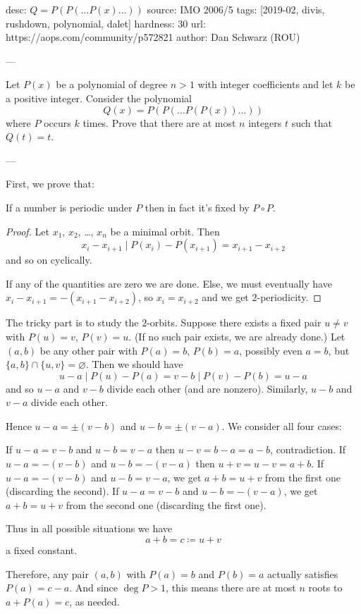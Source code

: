 desc:  $Q = P(P(\dots P(x) \dots))$
source:  IMO 2006/5
tags:  [2019-02, divis, rushdown, polynomial, dalet]
hardness: 30
url: https://aops.com/community/p572821
author: Dan Schwarz (ROU)

---

Let $P(x)$ be a polynomial of degree $n > 1$
with integer coefficients and let $k$ be a positive integer.
Consider the polynomial
\[ Q(x) = P(P(\dots P(P(x)) \dots )) \] where $P$ occurs $k$ times.
Prove that there are at most $n$ integers $t$ such that $Q(t) = t$.


---

First, we prove that:
\begin{claim*}
  [Putnam 2000 et al]
  If a number is periodic under $P$
  then in fact it's fixed by $P \circ P$.
\end{claim*}
\begin{proof}
  Let $x_1$, $x_2$, \dots, $x_n$ be a minimal orbit.
  Then
  \[ x_i - x_{i+1} \mid P(x_i) - P(x_{i+1})
    = x_{i+1} - x_{i+2} \]
  and so on cyclically.

  If any of the quantities are zero we are done.
  Else, we must eventually have $x_i - x_{i+1} = -(x_{i+1} - x_{i+2})$,
  so $x_i = x_{i+2}$ and we get $2$-periodicity.
\end{proof}

The tricky part is to study the $2$-orbits.
Suppose there exists a fixed pair $u \neq v$
with $P(u) = v$, $P(v) = u$.
(If no such pair exists, we are already done.)
Let $(a,b)$ be any other pair with $P(a) = b$, $P(b) = a$,
possibly even $a = b$, but $\{a,b\} \cap \{u,v\} = \varnothing$.
Then we should have
\[ u-a \mid P(u)-P(a) = v-b
  \mid P(v) - P(b) = u-a \]
and so $u-a$ and $v-b$ divide each other (and are nonzero).
Similarly, $u-b$ and $v-a$ divide each other.

Hence $u-a = \pm (v-b)$ and $u-b = \pm (v-a)$.
We consider all four cases:
\begin{itemize}
  \ii If $u-a = v-b$ and $u-b = v-a$
  then $u-v = b-a = a-b$, contradiction.
  \ii If $u-a = -(v-b)$ and $u-b = -(v-a)$
  then $u+v = u-v = a+b$.
  \ii If $u-a = -(v-b)$ and $u-b = v-a$,
  we get $a+b = u+v$ from the first one
  (discarding the second).
  \ii If $u-a = v-b$ and $u-b = -(v-a)$,
  we get $a+b = u+v$ from the second one
  (discarding the first one).
\end{itemize}
Thus in all possible situations we have
\[ a+b = c \coloneqq u+v \]
a fixed constant.

Therefore, any pair $(a,b)$ with $P(a) = b$
and $P(b) = a$ actually satisfies $P(a) = c-a$.
And since $\deg P > 1$,
this means there are at most $n$ roots to $a+P(a)=c$, as needed.
